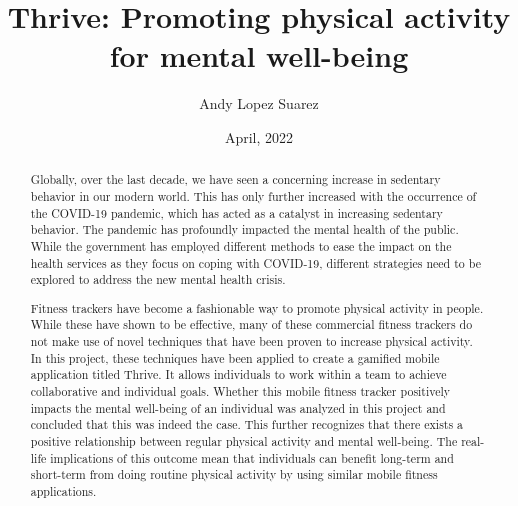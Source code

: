 \documentclass{l4proj}
\begin{document}
\title{Thrive: Promoting physical activity for mental well-being}
\author{Andy Lopez Suarez}
\date{April, 2022}

\maketitle
\begin{abstract}
Globally, over the last decade, we have seen a concerning increase in sedentary behavior in our modern world. This has only further increased with the occurrence of the COVID-19 pandemic, which has acted as a catalyst in increasing sedentary behavior. The pandemic has profoundly impacted the mental health of the public. While the government has employed different methods to ease the impact on the health services as they focus on coping with COVID-19, different strategies need to be explored to address the new mental health crisis. 

Fitness trackers have become a fashionable way to promote physical activity in people. While these have shown to be effective, many of these commercial fitness trackers do not make use of novel techniques that have been proven to increase physical activity. In this project, these techniques have been applied to create a gamified mobile application titled Thrive. It allows individuals to work within a team to achieve collaborative and individual goals. Whether this mobile fitness tracker positively impacts the mental well-being of an individual was analyzed in this project and concluded that this was indeed the case. This further recognizes that there exists a positive relationship between regular physical activity and mental well-being. The real-life implications of this outcome mean that individuals can benefit long-term and short-term from doing routine physical activity by using similar mobile fitness applications.

\end{abstract}


%
%
%
\educationalconsent
\end{document}
